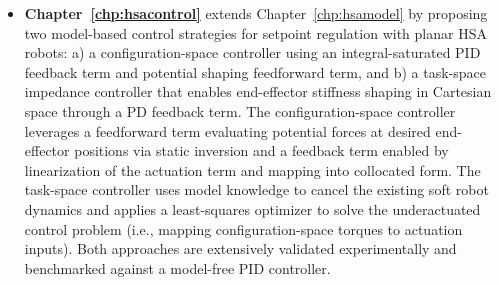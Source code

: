 \begin{itemize}
    \item \textbf{Chapter~\ref{chp:hsacontrol}} extends Chapter~\ref{chp:hsamodel} by proposing two model-based control strategies for setpoint regulation with planar \gls{HSA} robots: a) a configuration-space controller using an integral-saturated PID feedback term and potential shaping feedforward term, and b) a task-space impedance controller that enables end-effector stiffness shaping in Cartesian space through a PD feedback term. The configuration-space controller leverages a feedforward term evaluating potential forces at desired end-effector positions via static inversion and a feedback term enabled by linearization of the actuation term and mapping into collocated form. The task-space controller uses model knowledge to cancel the existing soft robot dynamics and applies a least-squares optimizer to solve the underactuated control problem (i.e., mapping configuration-space torques to actuation inputs). Both approaches are extensively validated experimentally and benchmarked against a model-free PID controller.  

\end{itemize}
